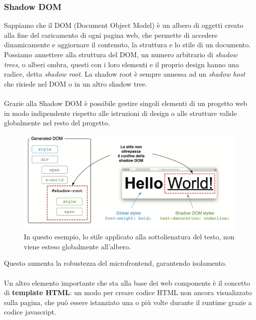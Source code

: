 \subsubsection{Shadow DOM}
Sappiamo che il DOM (Document Object Model) è un albero di oggetti creato alla fine del caricamento di ogni pagina web, che 
permette di accedere dinamicamente e aggiornare il contenuto, la struttura e lo stile di un documento.\cite{dom}
\\
Possiamo annettere alla struttura del DOM, un numero arbitrario di \emph{shadow trees}, 
o alberi ombra, questi con i loro elementi e il proprio design hanno una radice, detta  \emph{shadow root}.
La shadow root è sempre annessa ad un \emph{shadow host} che risiede nel DOM o in un altro shadow tree.
\\\\
Grazie alla Shadow DOM è possibile gestire singoli elementi di un progetto web in modo indipendente rispetto 
alle istruzioni di design o alle strutture valide globalmente nel resto del progetto.
\\
\begin{figure}[H]
    \centering
    \includegraphics[width=140mm]{img/shadowdom}
    \caption{In questo esempio, lo stile applicato alla sottolienatura del testo, non viene esteso globalmente all'albero.}
  \end{figure}
Questo aumenta la robustezza del microfrontend, garantendo isolamento.
\\\\
Un altro elemento importante che sta alla base dei web components è il concetto di \textbf{template HTML}: 
un modo per creare codice HTML non ancora visualizzato sulla pagina, che può essere istanziato una o più volte 
durante il runtime grazie a codice javascript.



